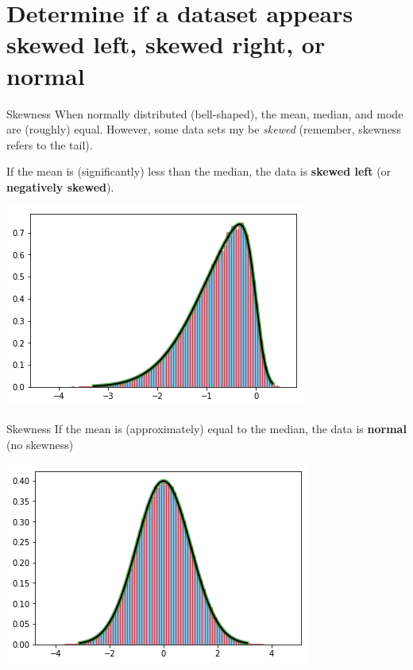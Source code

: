 \documentclass[t]{beamer}
\begin{document}
\section{Determine if a dataset appears skewed left, skewed right, or normal}

\begin{frame}{Skewness}
When normally distributed (bell-shaped), the mean, median, and mode are (roughly) equal. However, some data sets my be \emph{skewed} (remember, skewness refers to the tail).	\newline\\	\pause

If the mean is (significantly) less than the median, the data is \textbf{skewed left} (or \textbf{negatively skewed}).	
\begin{center}
\includegraphics[scale=0.5]{../Images/left_skewed.png}
\end{center}
\end{frame}

\begin{frame}{Skewness}
If the mean is (approximately) equal to the median, the data is \textbf{normal} (no skewness)
\begin{center}
\includegraphics[scale=0.5]{../Images/normal.png}
\end{center}
\end{frame}
\end{document}

